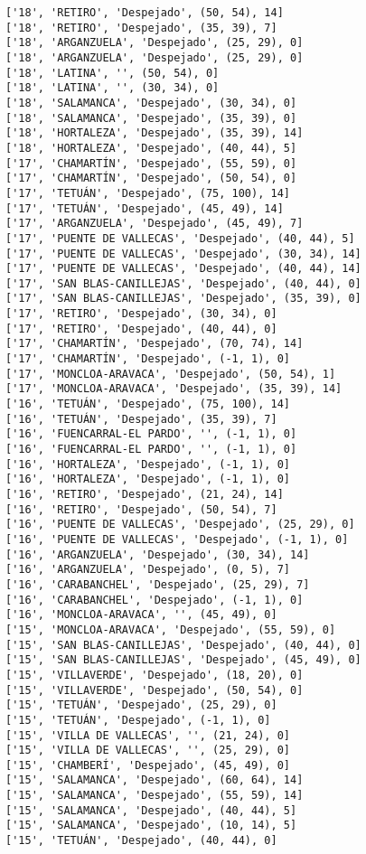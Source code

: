 \documentclass[11pt]{article}
\begin{document}
\begin{Verbatim}[commandchars=\\\{\}]
['18', 'RETIRO', 'Despejado', (50, 54), 14]
['18', 'RETIRO', 'Despejado', (35, 39), 7]
['18', 'ARGANZUELA', 'Despejado', (25, 29), 0]
['18', 'ARGANZUELA', 'Despejado', (25, 29), 0]
['18', 'LATINA', '', (50, 54), 0]
['18', 'LATINA', '', (30, 34), 0]
['18', 'SALAMANCA', 'Despejado', (30, 34), 0]
['18', 'SALAMANCA', 'Despejado', (35, 39), 0]
['18', 'HORTALEZA', 'Despejado', (35, 39), 14]
['18', 'HORTALEZA', 'Despejado', (40, 44), 5]
['17', 'CHAMARTÍN', 'Despejado', (55, 59), 0]
['17', 'CHAMARTÍN', 'Despejado', (50, 54), 0]
['17', 'TETUÁN', 'Despejado', (75, 100), 14]
['17', 'TETUÁN', 'Despejado', (45, 49), 14]
['17', 'ARGANZUELA', 'Despejado', (45, 49), 7]
['17', 'PUENTE DE VALLECAS', 'Despejado', (40, 44), 5]
['17', 'PUENTE DE VALLECAS', 'Despejado', (30, 34), 14]
['17', 'PUENTE DE VALLECAS', 'Despejado', (40, 44), 14]
['17', 'SAN BLAS-CANILLEJAS', 'Despejado', (40, 44), 0]
['17', 'SAN BLAS-CANILLEJAS', 'Despejado', (35, 39), 0]
['17', 'RETIRO', 'Despejado', (30, 34), 0]
['17', 'RETIRO', 'Despejado', (40, 44), 0]
['17', 'CHAMARTÍN', 'Despejado', (70, 74), 14]
['17', 'CHAMARTÍN', 'Despejado', (-1, 1), 0]
['17', 'MONCLOA-ARAVACA', 'Despejado', (50, 54), 1]
['17', 'MONCLOA-ARAVACA', 'Despejado', (35, 39), 14]
['16', 'TETUÁN', 'Despejado', (75, 100), 14]
['16', 'TETUÁN', 'Despejado', (35, 39), 7]
['16', 'FUENCARRAL-EL PARDO', '', (-1, 1), 0]
['16', 'FUENCARRAL-EL PARDO', '', (-1, 1), 0]
['16', 'HORTALEZA', 'Despejado', (-1, 1), 0]
['16', 'HORTALEZA', 'Despejado', (-1, 1), 0]
['16', 'RETIRO', 'Despejado', (21, 24), 14]
['16', 'RETIRO', 'Despejado', (50, 54), 7]
['16', 'PUENTE DE VALLECAS', 'Despejado', (25, 29), 0]
['16', 'PUENTE DE VALLECAS', 'Despejado', (-1, 1), 0]
['16', 'ARGANZUELA', 'Despejado', (30, 34), 14]
['16', 'ARGANZUELA', 'Despejado', (0, 5), 7]
['16', 'CARABANCHEL', 'Despejado', (25, 29), 7]
['16', 'CARABANCHEL', 'Despejado', (-1, 1), 0]
['16', 'MONCLOA-ARAVACA', '', (45, 49), 0]
['15', 'MONCLOA-ARAVACA', 'Despejado', (55, 59), 0]
['15', 'SAN BLAS-CANILLEJAS', 'Despejado', (40, 44), 0]
['15', 'SAN BLAS-CANILLEJAS', 'Despejado', (45, 49), 0]
['15', 'VILLAVERDE', 'Despejado', (18, 20), 0]
['15', 'VILLAVERDE', 'Despejado', (50, 54), 0]
['15', 'TETUÁN', 'Despejado', (25, 29), 0]
['15', 'TETUÁN', 'Despejado', (-1, 1), 0]
['15', 'VILLA DE VALLECAS', '', (21, 24), 0]
['15', 'VILLA DE VALLECAS', '', (25, 29), 0]
['15', 'CHAMBERÍ', 'Despejado', (45, 49), 0]
['15', 'SALAMANCA', 'Despejado', (60, 64), 14]
['15', 'SALAMANCA', 'Despejado', (55, 59), 14]
['15', 'SALAMANCA', 'Despejado', (40, 44), 5]
['15', 'SALAMANCA', 'Despejado', (10, 14), 5]
['15', 'TETUÁN', 'Despejado', (40, 44), 0]

\end{Verbatim}
\end{document}
